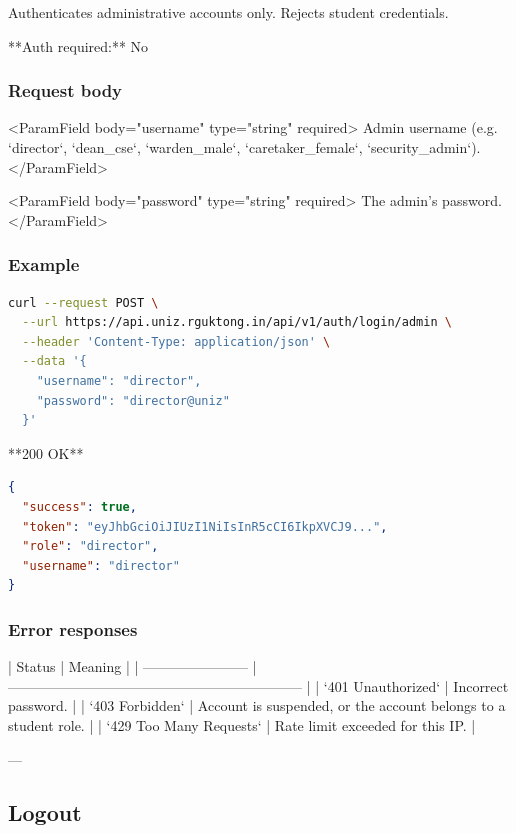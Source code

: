 Authenticates administrative accounts only. Rejects student credentials.

**Auth required:** No

\subsubsection{Request body}

<ParamField body="username" type="string" required>
  Admin username (e.g. `director`, `dean_cse`, `warden_male`,
  `caretaker_female`, `security_admin`).
</ParamField>

<ParamField body="password" type="string" required>
  The admin's password.
</ParamField>

\subsubsection{Example}

\begin{lstlisting}[language=bash]
curl --request POST \
  --url https://api.uniz.rguktong.in/api/v1/auth/login/admin \
  --header 'Content-Type: application/json' \
  --data '{
    "username": "director",
    "password": "director@uniz"
  }'

\end{lstlisting}

**200 OK**

\begin{lstlisting}[language=json]
{
  "success": true,
  "token": "eyJhbGciOiJIUzI1NiIsInR5cCI6IkpXVCJ9...",
  "role": "director",
  "username": "director"
}

\end{lstlisting}

\subsubsection{Error responses}

| Status                  | Meaning                                                         |
| ----------------------- | --------------------------------------------------------------- |
| `401 Unauthorized`      | Incorrect password.                                             |
| `403 Forbidden`         | Account is suspended, or the account belongs to a student role. |
| `429 Too Many Requests` | Rate limit exceeded for this IP.                                |

---

\subsection{Logout}

